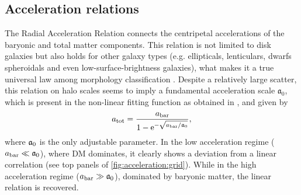 \subsection{Acceleration relations}
\label{sec:result:ac}


The Radial Acceleration Relation connects the centripetal accelerations of the baryonic and total matter components. This relation is not limited to disk galaxies but also holds for other galaxy types (e.g. ellipticals, lenticulars, dwarfs spheroidals and even low-surface-brightness galaxies), what makes it a true universal law among morphology classification \citep{2016PhRvL.117t1101M,2017ApJ...836..152L,2019ApJ...873..106D}. Despite a relatively large scatter, this relation on halo scales seems to imply a fundamental acceleration scale $\mathfrak{a}_0$, which is present in the non-linear fitting function as obtained in \cite{2016PhRvL.117t1101M}, and given by
%
\begin{equation}
	\label{eq:mcgaugh-fit}
	\SYMatot = \frac{\SYMabar}{1 - \e^{-\sqrt{\SYMabar/{\SYMafrak}}}},
\end{equation}
%
where $\mathfrak{a}_0$ is the only adjustable parameter. In the low acceleration regime ($a_\mathrm{bar} \ll \mathfrak{a}_0$), where DM dominates, it clearly shows a deviation from a linear correlation (see top panels of \cref{fig:acceleration:grid}). While in the high acceleration regime ($a_\mathrm{bar} \gg \mathfrak{a}_0$), dominated by baryonic matter, the linear relation is recovered.


